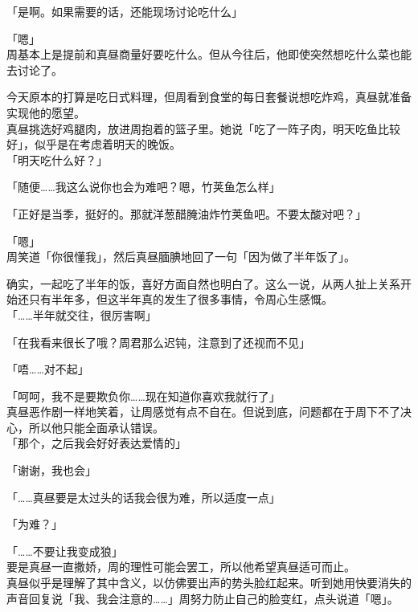 「是啊。如果需要的话，还能现场讨论吃什么」

「嗯」\\

周基本上是提前和真昼商量好要吃什么。但从今往后，他即使突然想吃什么菜也能去讨论了。

今天原本的打算是吃日式料理，但周看到食堂的每日套餐说想吃炸鸡，真昼就准备实现他的愿望。\\

真昼挑选好鸡腿肉，放进周抱着的篮子里。她说「吃了一阵子肉，明天吃鱼比较好」，似乎是在考虑着明天的晚饭。\\

「明天吃什么好？」

「随便……我这么说你也会为难吧？嗯，竹荚鱼怎么样」

「正好是当季，挺好的。那就洋葱醋腌油炸竹荚鱼吧。不要太酸对吧？」

「嗯」\\

周笑道「你很懂我」，然后真昼腼腆地回了一句「因为做了半年饭了」。

确实，一起吃了半年的饭，喜好方面自然也明白了。这么一说，从两人扯上关系开始还只有半年多，但这半年真的发生了很多事情，令周心生感慨。\\

「……半年就交往，很厉害啊」

「在我看来很长了哦？周君那么迟钝，注意到了还视而不见」

「唔……对不起」

「呵呵，我不是要欺负你……现在知道你喜欢我就行了」\\

真昼恶作剧一样地笑着，让周感觉有点不自在。但说到底，问题都在于周下不了决心，所以他只能全面承认错误。\\

「那个，之后我会好好表达爱情的」

「谢谢，我也会」

「……真昼要是太过头的话我会很为难，所以适度一点」

「为难？」

「……不要让我变成狼」\\

要是真昼一直撒娇，周的理性可能会罢工，所以他希望真昼适可而止。\\

真昼似乎是理解了其中含义，以仿佛要出声的势头脸红起来。听到她用快要消失的声音回复说「我、我会注意的……」周努力防止自己的脸变红，点头说道「嗯」。
